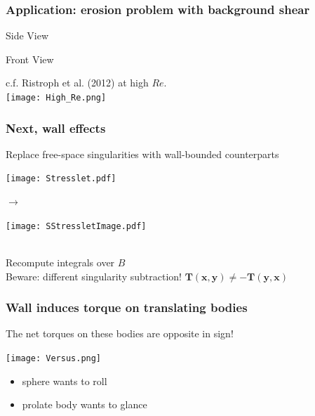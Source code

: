 \documentclass{beamer}
\newcommand{\bm}{\boldsymbol}
\begin{document}
\begin{frame}
\frametitle{Application: erosion problem with background shear}

\begin{center}
\begin{minipage}{0.45\linewidth}
Side View\\
\end{minipage}
\quad
\begin{minipage}{0.45\linewidth}
Front View\\
\end{minipage}
\end{center}
% 
c.f.  Ristroph et al. (2012) at high $Re$.  \\
\texttt{[image: High\_Re.png]}
\end{frame}

\begin{frame}
\frametitle{Next, wall effects}
Replace free-space singularities with wall-bounded counterparts\\
\begin{minipage}{0.3\linewidth}
\texttt{[image: Stresslet.pdf]} 
\end{minipage}
\quad\begin{minipage}{0.05\linewidth}
 $\to$
\end{minipage}\quad
\begin{minipage}{0.3\linewidth}
 \texttt{[image: SStressletImage.pdf]}
\end{minipage}
\\
Recompute integrals over $B$
\\
Beware: different singularity subtraction!  $\bm T(\bm x,\bm y) \neq -\bm T(\bm y,\bm x)$
\end{frame}


\begin{frame}
\frametitle{Wall induces torque on translating bodies}
\begin{center}
 \;
\end{center}
The net torques on these bodies are opposite in sign! 
\begin{minipage}{0.4\linewidth}
 \texttt{[image: Versus.png]}
\end{minipage}
\quad
\begin{minipage}{0.5\linewidth}
\begin{itemize}
 \item sphere wants to roll
 \item prolate body wants to glance
\end{itemize} 
\end{minipage}
\end{frame}
\end{document}
